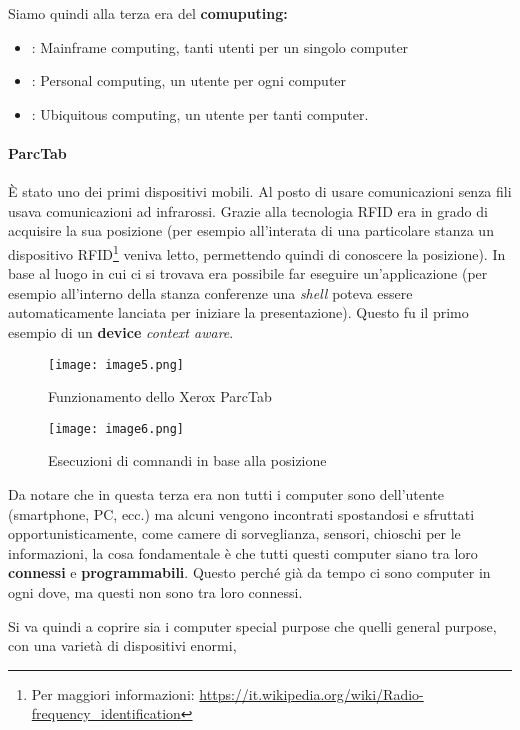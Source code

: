 Siamo quindi alla terza era del \textbf{comuputing:}

\begin{itemize}
\item[Era 1]: Mainframe computing, tanti utenti per un singolo computer

\item[Era 2]: Personal computing, un utente per ogni computer

\item[Era 3]: Ubiquitous computing, un utente per tanti computer.

\end{itemize}

\paragraph*{ParcTab} \`E stato uno dei primi dispositivi mobili. Al posto di
usare comunicazioni senza fili usava comunicazioni ad infrarossi. Grazie alla
tecnologia RFID era in grado di acquisire la sua posizione (per esempio
all'interata di una particolare stanza un dispositivo RFID\footnote{Per
maggiori informazioni:
\url{https://it.wikipedia.org/wiki/Radio-frequency_identification}} veniva
letto, permettendo quindi di conoscere la posizione). In base al luogo in cui ci
si trovava era possibile far eseguire un'applicazione (per esempio all'interno
della stanza conferenze una \textit{shell} poteva essere automaticamente
lanciata per iniziare la presentazione). Questo fu il primo esempio di un
\textbf{device} \textit{context aware}.

\begin{figure}[H]
  \texttt{[image: image5.png]}
  \caption{Funzionamento dello Xerox ParcTab}
\endminipage \hspace{75pt}
  \texttt{[image: image6.png]}
  \caption{Esecuzioni di comnandi in base alla posizione}
\endminipage
\end{figure}

Da notare che in questa terza era non tutti i computer sono dell'utente
(smartphone, PC, ecc.) ma alcuni vengono incontrati spostandosi e
sfruttati opportunisticamente, come camere di sorveglianza, sensori,
chioschi per le informazioni, la cosa fondamentale è che tutti questi
computer siano tra loro \textbf{connessi} e \textbf{programmabili}.
Questo perché già da tempo ci sono computer in ogni dove, ma questi non
sono tra loro connessi.

Si va quindi a coprire sia i computer special purpose che quelli general
purpose, con una varietà di dispositivi enormi,

